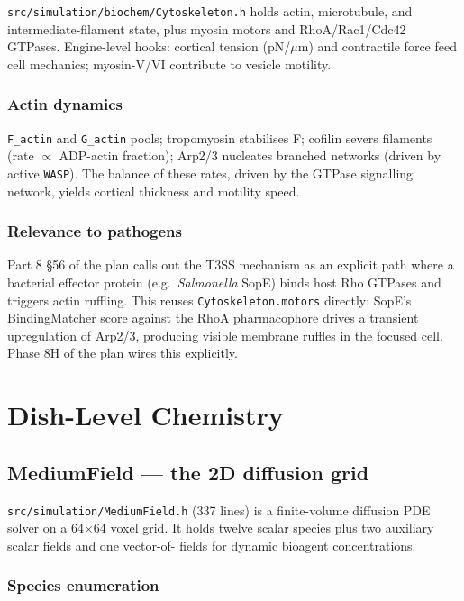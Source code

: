 \documentclass[11pt,letterpaper,twoside,openany]{book}
\newcommand{\code}[1]{\texttt{#1}}
\newcommand{\file}[1]{\texttt{\small#1}}
\newcommand{\um}{\ensuremath{\mu\text{m}}}
\begin{document}
\file{src/simulation/biochem/Cytoskeleton.h} holds actin,
microtubule, and intermediate-filament state, plus myosin motors and
RhoA/Rac1/Cdc42 GTPases. Engine-level hooks: cortical tension
(pN/\um) and contractile force feed cell mechanics; myosin-V/VI
contribute to vesicle motility.

\section{Actin dynamics}

\code{F\_actin} and \code{G\_actin} pools; tropomyosin stabilises F;
cofilin severs filaments (rate $\propto$ ADP-actin fraction); Arp2/3
nucleates branched networks (driven by active \code{WASP}). The
balance of these rates, driven by the GTPase signalling network,
yields cortical thickness and motility speed.

\section{Relevance to pathogens}

Part 8 §56 of the plan calls out the T3SS mechanism as an explicit
path where a bacterial effector protein (e.g.\ \emph{Salmonella} SopE)
binds host Rho GTPases and triggers actin ruffling. This reuses
\code{Cytoskeleton.motors} directly: SopE's BindingMatcher score
against the RhoA pharmacophore drives a transient upregulation of
Arp2/3, producing visible membrane ruffles in the focused cell.
Phase 8H of the plan wires this explicitly.

\part{Dish-Level Chemistry}

\chapter{MediumField --- the 2D diffusion grid}
\label{ch:medium}

\file{src/simulation/MediumField.h} (337 lines) is a finite-volume
diffusion PDE solver on a 64$\times$64 voxel grid. It holds twelve
scalar species plus two auxiliary scalar fields and one vector-of-
fields for dynamic bioagent concentrations.

\section{Species enumeration}
\end{document}
